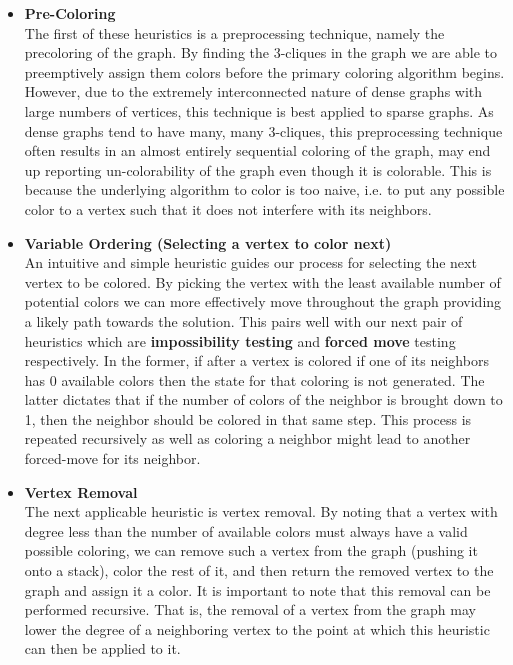 \documentclass[10pt,twoside]{article}
\begin{document}
\begin{itemize}  
  \item \textbf{Pre-Coloring} \\
  The first of these heuristics is a preprocessing technique, namely the
  precoloring of the graph. By finding the 3-cliques in the graph we are able
  to preemptively assign them colors before the primary coloring algorithm
  begins. However, due to the extremely interconnected nature of dense graphs
  with large numbers of vertices, this technique is best applied to sparse
  graphs. As dense graphs tend to have many, many 3-cliques, this preprocessing
  technique often results in an almost entirely sequential coloring of the
  graph, may end up reporting un-colorability of the graph even though it is
  colorable. This is because the underlying algorithm to color is too naive,
    i.e. to put any possible color to a vertex such that it does not interfere
      with its neighbors.

  \item \textbf{Variable Ordering (Selecting a vertex to color next)} \\
            An intuitive and simple heuristic guides our process for selecting
            the next vertex to be colored. By picking the vertex with the least
            available number of potential colors we can more effectively move
            throughout the graph providing a likely path towards the solution. 
            This pairs well with our next pair of heuristics which are \textbf{impossibility
            testing} and \textbf{forced move} testing respectively. In the former, if
            after a vertex is colored if one of its neighbors has 0 available
            colors then the state for that coloring is not generated. The
            latter dictates that if the number of colors of the neighbor is
            brought down to 1, then the neighbor should be colored in that same
            step. This process is repeated recursively as well as coloring a
            neighbor might lead to another forced-move for its neighbor.  
            
  \item \textbf{Vertex Removal} \\
            The next applicable heuristic is vertex removal. By noting that a
            vertex with degree less than the number of available colors must
            always have a valid possible coloring, we can remove such a vertex
            from the graph (pushing it onto a stack), color the rest of it, and
            then return the removed vertex to the graph and assign it a color.
            It is important to note that this removal can be performed
            recursive. That is, the removal of a vertex from the graph may
            lower the degree of a neighboring vertex to the point at which this
            heuristic can then be applied to it.  
            


\end{itemize}
\end{document}
